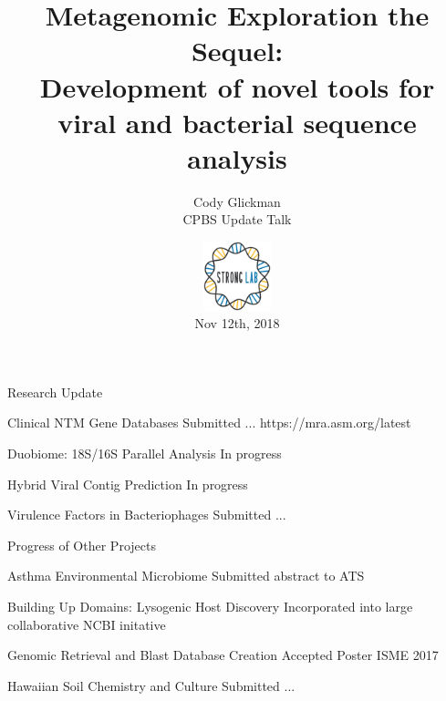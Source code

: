 \documentclass[11pt]{beamer}
\author{Cody Glickman \\ CPBS Update Talk}
\title{Metagenomic Exploration the Sequel: \\ Development of novel tools for viral and bacterial sequence analysis}
\date{ \includegraphics[height=2cm, width=2cm]{lablogo.png} \\ Nov 12th, 2018}
\begin{document}
	\maketitle
	\begin{frame}{Research Update}
	\begin{block}{\alert{Clinical NTM Gene Databases}}
	Submitted ...
	https://mra.asm.org/latest 
	\end{block}
	
	\begin{block}{\alert{Duobiome: 18S/16S Parallel Analysis}}
	In progress
	\end{block}
	
	\begin{block}{\alert{Hybrid Viral Contig Prediction}}
	In progress
	\end{block}
	
	\begin{block}{\alert{Virulence Factors in Bacteriophages}}
	Submitted ...
	\end{block}
	\end{frame}
	
	\begin{frame}{Progress of Other Projects}
	\begin{block}{Asthma Environmental Microbiome}
	Submitted abstract to ATS
	\end{block}
	
	\begin{block}{Building Up Domains: Lysogenic Host Discovery}
	Incorporated into large collaborative NCBI initative
	\end{block}
	
	\begin{block}{Genomic Retrieval and Blast Database Creation}
	Accepted Poster ISME 2017
	\end{block}
	
	\begin{block}{Hawaiian Soil Chemistry and Culture}
	Submitted ...
	\end{block}
	

	\end{frame}
\section{}
\end{document}
